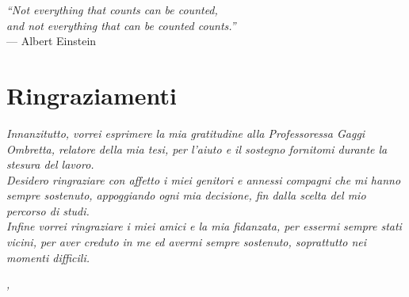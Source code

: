 
\cleardoublepage
{}
{}

\begin{flushright}{
	\slshape    
	``Not everything that counts can be counted, \\and not everything that can be counted counts.''} \\ 
	\medskip
    --- Albert Einstein
\end{flushright}


\bigskip

\begingroup
\let\clearpage\relax
\let\cleardoublepage\relax

\chapter*{Ringraziamenti}

\noindent \textit{Innanzitutto, vorrei esprimere la mia gratitudine alla Professoressa Gaggi Ombretta, relatore della mia tesi, per l'aiuto e il sostegno fornitomi durante la stesura del lavoro.}\\

\noindent \textit{Desidero ringraziare con affetto i miei genitori e annessi compagni che mi hanno sempre sostenuto, appoggiando ogni mia decisione, fin dalla scelta del mio percorso di studi.} \\
	
\noindent \textit{Infine vorrei ringraziare i miei amici e la mia fidanzata, per essermi sempre stati vicini, per aver creduto in me ed avermi sempre sostenuto, soprattutto nei momenti difficili.} \\

\bigskip

\noindent\textit{\myLocation, \myTime}
\hfill \myName

\endgroup

